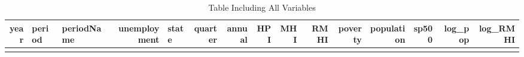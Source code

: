 \documentclass[
]{article}
\begin{document}
\begin{longtable}[]{@{}rllrlrrrrrrrrrr@{}}
\caption{Table Including All Variables}\tabularnewline
\toprule
\begin{minipage}[b]{0.03\columnwidth}\raggedleft
year\strut
\end{minipage} & \begin{minipage}[b]{0.04\columnwidth}\raggedright
period\strut
\end{minipage} & \begin{minipage}[b]{0.06\columnwidth}\raggedright
periodName\strut
\end{minipage} & \begin{minipage}[b]{0.07\columnwidth}\raggedleft
unemployment\strut
\end{minipage} & \begin{minipage}[b]{0.03\columnwidth}\raggedright
state\strut
\end{minipage} & \begin{minipage}[b]{0.04\columnwidth}\raggedleft
quarter\strut
\end{minipage} & \begin{minipage}[b]{0.04\columnwidth}\raggedleft
annual\strut
\end{minipage} & \begin{minipage}[b]{0.04\columnwidth}\raggedleft
HPI\strut
\end{minipage} & \begin{minipage}[b]{0.03\columnwidth}\raggedleft
MHI\strut
\end{minipage} & \begin{minipage}[b]{0.03\columnwidth}\raggedleft
RMHI\strut
\end{minipage} & \begin{minipage}[b]{0.04\columnwidth}\raggedleft
poverty\strut
\end{minipage} & \begin{minipage}[b]{0.06\columnwidth}\raggedleft
population\strut
\end{minipage} & \begin{minipage}[b]{0.03\columnwidth}\raggedleft
sp500\strut
\end{minipage} & \begin{minipage}[b]{0.05\columnwidth}\raggedleft
log\_pop\strut
\end{minipage} & \begin{minipage}[b]{0.05\columnwidth}\raggedleft
log\_RMHI\strut
\end{minipage}\tabularnewline
\midrule
\endfirsthead
\toprule
\begin{minipage}[b]{0.03\columnwidth}\raggedleft

\end{minipage}
\end{longtable}
\end{document}
